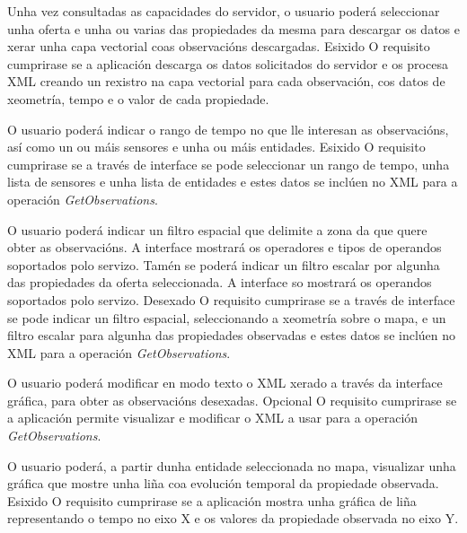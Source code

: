 		  	{Unha vez consultadas as capacidades do servidor, o usuario poderá seleccionar unha oferta e unha ou varias das propiedades da mesma para descargar os datos e xerar unha capa vectorial coas observacións descargadas.}%
			{Esixido}%
			{O requisito cumprirase se a aplicación descarga os datos solicitados do servidor e os procesa XML creando un rexistro na capa vectorial para cada observación, cos datos de xeometría, tempo e o valor de cada propiedade.}%
			
		  	{O usuario poderá indicar o rango de tempo no que lle interesan as observacións, así como un ou máis sensores e unha ou máis entidades.}%
			{Esixido}%
			{O requisito cumprirase se a través de interface se pode seleccionar un rango de tempo, unha lista de sensores e unha lista de entidades e estes datos se inclúen no XML para a operación \emph{GetObservations}.}%
			
		  	{O usuario poderá indicar un filtro espacial que delimite a zona da que quere obter as observacións. A interface mostrará os operadores e tipos de operandos soportados polo servizo. Tamén se poderá indicar un filtro escalar por algunha das propiedades da oferta seleccionada. A interface so mostrará os operandos soportados polo servizo.}%
			{Desexado}%
			{O requisito cumprirase se a través de interface se pode indicar un filtro espacial, seleccionando a xeometría sobre o mapa, e un filtro escalar para algunha das propiedades observadas e estes datos se inclúen no XML para a operación \emph{GetObservations}.}%
			
		  	{O usuario poderá modificar en modo texto o XML xerado a través da interface gráfica,  para obter as observacións desexadas.}%
			{Opcional}%
			{O requisito cumprirase se a aplicación permite visualizar e modificar o XML a usar para a operación \emph{GetObservations}.}%
			
		  	{O usuario poderá, a partir dunha entidade seleccionada no mapa, visualizar unha gráfica que mostre unha liña coa evolución temporal da propiedade observada.}%
			{Esixido}%
			{O requisito cumprirase se a aplicación mostra unha gráfica de liña representando o tempo no eixo X e os valores da propiedade observada no eixo Y.}%
			
